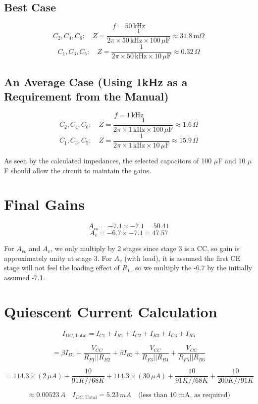 \subsection{Best Case}
\[
f = 50 \, \text{kHz}
\]
\[
C_2, C_4, C_6: \quad Z = \frac{1}{2\pi \times 50 \, \text{kHz} \times 100 \, \mu\text{F}} \approx 31.8 \, \text{m}\Omega
\]
\[
C_1, C_3, C_5: \quad Z = \frac{1}{2\pi \times 50 \, \text{kHz} \times 10 \, \mu\text{F}} \approx 0.32 \, \Omega
\]

\subsection{An Average Case (Using 1kHz as a Requirement from the Manual)}
\[
f = 1 \, \text{kHz}
\]
\[
C_2, C_4, C_6: \quad Z = \frac{1}{2\pi \times 1 \, \text{kHz} \times 100 \, \mu\text{F}} \approx 1.6 \, \Omega
\]
\[
C_1, C_3, C_5: \quad Z = \frac{1}{2\pi \times 1 \, \text{kHz} \times 10 \, \mu\text{F}} \approx 15.9 \, \Omega
\]

As seen by the calculated impedances, the selected capacitors of 100 \(\mu\)F and 10 \(\mu\)F should allow the circuit to maintain the gains.

\section{Final Gains}
\[
A_{vo} = -7.1 \times -7.1 = 50.41
\]
\[
A_v = -6.7 \times -7.1 = 47.57
\]

For \(A_{vo}\) and \(A_v\), we only multiply by 2 stages since stage 3 is a CC, so gain is approximately unity at stage 3. For \(A_v\) (with load), it is assumed the first CE stage will not feel the loading effect of \(R_L\), so we multiply the -6.7 by the initially assumed -7.1.

\section{Quiescent Current Calculation}
\[
I_{DC, \text{Total}} = I_{C1} + I_{R1} + I_{C2} + I_{R3} + I_{C3} + I_{R5}
\]

\[
= \beta I_{B1} + \frac{V_{CC}}{R_{F1} || R_{B2}} + \beta I_{B2} + \frac{V_{CC}}{R_{F3} || R_{B4}} + \frac{V_{CC}}{R_{F5} || R_{B6}}
\]

\[
= 114.3 \times (2 \, \mu A) + \frac{10}{91K // 68K} + 114.3 \times (30 \, \mu A) + \frac{10}{91K // 68K} + \frac{10}{200K // 91K}
\]

\[
\approx 0.00523 \, A \quad I_{DC, \text{Total}} = 5.23 \, mA \quad \text{(less than 10 mA, as required)}
\]

